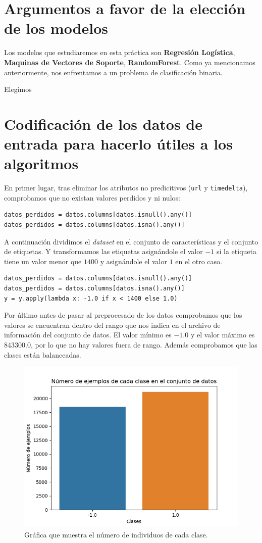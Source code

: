 \documentclass[size=a4, parskip=half, titlepage=false, toc=flat, toc=bib, 12pt]{scrartcl}
\begin{document}
\section{Argumentos a favor de la elección de los modelos}

Los modelos que estudiaremos en esta práctica son \textbf{Regresión Logística}, \textbf{Maquinas de Vectores de Soporte}, \textbf{RandomForest}. Como ya mencionamos anteriormente, nos enfrentamos a un problema de clasificación binaria.

Elegimos

\section{Codificación de los datos de entrada para hacerlo útiles a los algoritmos}
En primer lugar, tras eliminar los atributos no predicitivos (\verb|url| y \verb|timedelta|), comprobamos que no existan valores perdidos y ni nulos:
\begin{verbatim}
datos_perdidos = datos.columns[datos.isnull().any()]
datos_perdidos = datos.columns[datos.isna().any()]
\end{verbatim}
A continuación dividimos el \textit{dataset} en el conjunto de características y el conjunto de etiquetas. Y transformamos las etiquetas asignándole el valor $-1$ si la etiqueta tiene un valor menor que $1400$ y asignándole el valor $1$ en el otro caso.
\begin{verbatim}
datos_perdidos = datos.columns[datos.isnull().any()]
datos_perdidos = datos.columns[datos.isna().any()]
y = y.apply(lambda x: -1.0 if x < 1400 else 1.0)
\end{verbatim}

Por último antes de pasar al preprocesado de los datos comprobamos que los valores se encuentran dentro del rango que nos indica en el archivo de información del conjunto de datos. El valor mínimo es $-1.0$ y el valor máximo es $843300.0$, por lo que no hay valores fuera de rango. Además comprobamos que las clases están balanceadas.
\begin{figure}[H]
\centering
\includegraphics[width=1\textwidth]{./img/balanceadas}
\caption{Gráfica que muestra el número de individuos de cada clase.}
\end{figure}
\end{document}
